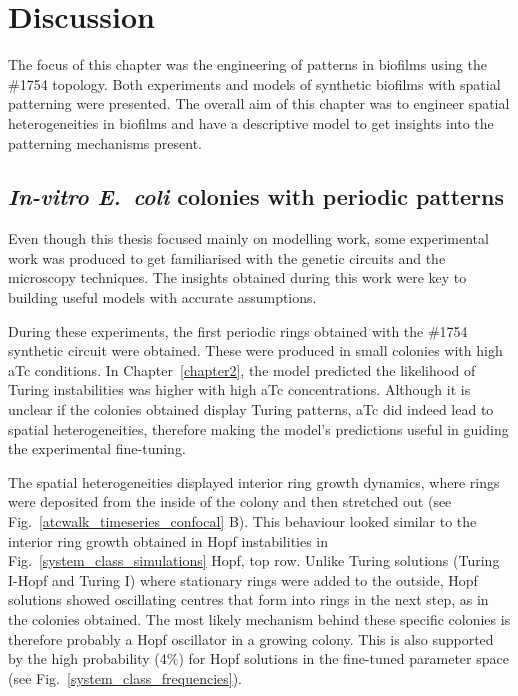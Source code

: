 \section{Discussion}

The focus of this chapter was the engineering of patterns in biofilms using the \#1754 topology.
Both experiments and models of synthetic biofilms with spatial patterning were presented.
The overall aim of this chapter was to engineer spatial heterogeneities in biofilms and have a descriptive model to get insights into the patterning mechanisms present.

\subsection{\textit{In-vitro E.~coli} colonies with periodic patterns}
Even though this thesis focused mainly on modelling work, some experimental work was produced to get familiarised with the genetic circuits and the microscopy techniques.
The insights obtained during this work were key to building useful models with accurate assumptions.

During these experiments, the first periodic rings obtained with the \#1754 synthetic circuit were obtained.
These were produced in small colonies with high aTc conditions.
In Chapter~\ref{chapter2}, the model predicted the likelihood of Turing instabilities was higher with high aTc concentrations.
Although it is unclear if the colonies obtained display Turing patterns, aTc did indeed lead to spatial heterogeneities, therefore making the model's predictions useful in guiding the experimental fine-tuning.

The spatial heterogeneities displayed interior ring growth dynamics, where rings were deposited from the inside of the colony and then stretched out (see Fig.~\ref{atcwalk_timeseries_confocal} B).
This behaviour looked similar to the interior ring growth obtained in Hopf instabilities in Fig.~\ref{system_class_simulations} Hopf, top row.
Unlike Turing solutions (Turing I-Hopf and Turing I) where stationary rings were added to the outside, Hopf solutions showed oscillating centres that form into rings in the next step, as in the colonies obtained.
The most likely mechanism behind these specific colonies is therefore probably a Hopf oscillator in a growing colony.
This is also supported by the high probability (4\%) for Hopf solutions in the fine-tuned parameter space (see Fig.~\ref{system_class_frequencies}).

